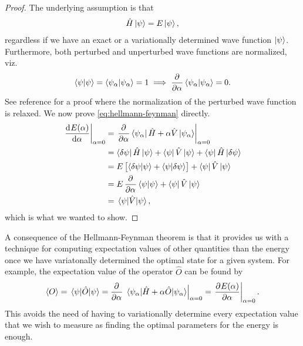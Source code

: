         \begin{proof}
            The underlying assumption is that
            \begin{align}
                \hat{H}\ket{\psi} = E\ket{\psi},
            \end{align}
            regardless if we have an exact or a variationally determined wave
            function $\ket{\psi}$.
            Furthermore, both perturbed and unperturbed wave functions are
            normalized, viz.
            \begin{align}
                \braket{\psi}{\psi} = \braket{\psi_{\alpha}}{\psi_{\alpha}} = 1
                \implies
                \dpd[]{}{\alpha} \braket{\psi_{\alpha}}{\psi_{\alpha}} = 0.
            \end{align}
            See reference \cite{helgaker-molecular} for a proof where the
            normalization of the perturbed wave function is relaxed.
            We now prove \autoref{eq:hellmann-feynman} directly.
            \begin{align}
                \left.\dod[]{E(\alpha)}{\alpha}\right\rvert_{\alpha = 0}
                &=
                \left.
                \dpd[]{}{\alpha}
                \bra{\psi_{\alpha}}\hamil + \alpha\hat{V}\ket{\psi_{\alpha}}
                \right\rvert_{\alpha = 0}
                \\
                &=
                \bra{\delta\psi}\hamil\ket{\psi}
                + \bra{\psi}\hat{V}\ket{\psi}
                + \bra{\psi}\hamil\ket{\delta\psi}
                \\
                &=
                \energy \brak{
                    \braket{\delta\psi}{\psi}
                    + \braket{\psi}{\delta\psi}
                }
                + \bra{\psi}\hat{V}\ket{\psi}
                \\
                &=
                \energy \dpd[]{}{\alpha}\braket{\psi}{\psi}
                + \bra{\psi}\hat{V}\ket{\psi}
                \\
                &=
                \mel{\psi}{\hat{V}}{\psi},
            \end{align}
            which is what we wanted to show.
        \end{proof}
        A consequence of the Hellmann-Feynman theorem is that it provides us
        with a technique for computing expectation values of other quantities
        than the energy once we have variatonally determined the optimal state
        for a given system.
        For example, the expectation value of the operator $\hat{O}$ can be
        found by
        \begin{align}
            \expv{O}
            = \mel{\psi}{\hat{O}}{\psi}
            = \dpd[]{}{\alpha}
            \left.
            \mel{\psi_{\alpha}}{\hamil + \alpha\hat{O}}{\psi_{\alpha}}
            \right\rvert_{\alpha = 0}
            =
            \left.
            \dpd[]{E(\alpha)}{\alpha}
            \right\rvert_{\alpha = 0}.
        \end{align}
        This avoids the need of having to variationally determine every
        expectation value that we wish to measure as finding the optimal
        parameters for the energy is enough.

